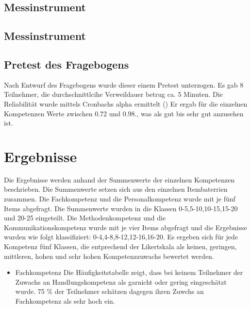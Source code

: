 \documentclass[12pt, bibliography=totoc]{scrartcl}
\begin{document}
\subsection{Messinstrument}\label{messinstrument}

\subsection{Messinstrument}\label{messinstrument-1}

\subsection{Pretest des Fragebogens}\label{pretest-des-fragebogens}

Nach Entwurf des Fragebogens wurde dieser einem Pretest unterzogen. Es
gab 8 Teilnehmer, die durchschnittlcihe Verweildauer betrug ca. 5
Minuten. Die Reliabilität wurde mittels Cronbachs alpha ermittelt
(\textcite{Wassa}) Er ergab für die einzelnen Kompetenzen Werte zwischen
0.72 und 0.98., was als gut bis sehr gut anzusehen ist.

\section{Ergebnisse}\label{ergebnisse}

Die Ergebnisse werden anhand der Summenwerte der einzelnen Kompetenzen
beschrieben. Die Summenwerte setzen sich aus den einzelnen Itembaterrien
zusammen. Die Fachkompetenz und die Personalkompetenz wurde mit je fünf
Items abgefragt. Die Summenwerte wurden in die Klassen
0-5,5-10,10-15,15-20 und 20-25 eingeteilt. Die Methodenkompetenz und die
Kommunikationskompetenz wurde mit je vier Items abgefragt und die
Ergebnisse wurden wie folgt klassifiziert: 0-4,4-8,8-12,12-16,16-20. Es
ergeben sich für jede Kompetenz fünf Klassen, die entprechend der
Likertskala als keinen, geringen, mittleren, hohen und sehr hohen
Kompetenzzuwachs bewertet werden.

\begin{itemize}
\tightlist
\item
  Fachkompetenz Die Häufigkeitstabelle zeigt, dass bei keinem Teilnehmer
  der Zuwachs an Handlungskompetenz als garnicht oder gering
  eingeschätzt wurde. 75 \% der Teilnehmer schätzen dagegen ihren Zuwchs
  an Fachkompetenz als sehr hoch ein.
\end{itemize}
\end{document}
